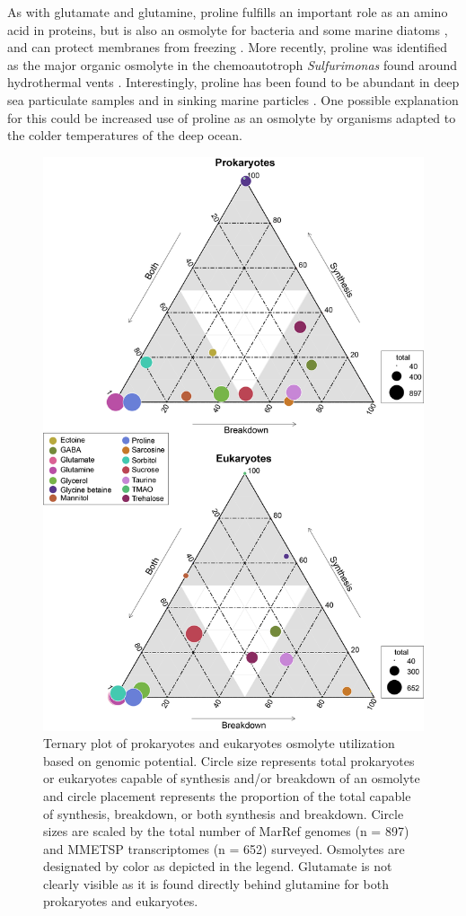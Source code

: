 \documentclass[utf8]{frontiersSCNS} %
\begin{document}
As with glutamate and glutamine, proline fulfills an important role as an amino acid in proteins, but is also an osmolyte for bacteria \citep{Burg2008,Brill2011} and some marine diatoms \citep{Dawson2020,Dawson2020.2}, and can protect membranes from freezing \citep{Yancey2005}. More recently, proline was identified as the major organic osmolyte in the chemoautotroph \emph{Sulfurimonas} found around hydrothermal vents \citep{Gotz2018}. Interestingly, proline has been found to be abundant in deep sea particulate samples \citep{Takasu2015,Johnson2021} and in sinking marine particles \citep{Johnson2020}. One possible explanation for this could be increased use of proline as an osmolyte by organisms adapted to the colder temperatures of the deep ocean.
\begin{figure}[t!]
    \centering
    \includegraphics[width = 0.6\columnwidth]{Figures/ProkEukOverlapBW.png}
    \caption{Ternary plot of prokaryotes and eukaryotes osmolyte utilization based on genomic potential. Circle size represents total prokaryotes or eukaryotes capable of synthesis and/or breakdown of an osmolyte and circle placement represents the proportion of the total capable of synthesis, breakdown, or both synthesis and breakdown. Circle sizes are scaled by the total number of MarRef genomes (n = 897) and MMETSP transcriptomes (n = 652) surveyed. Osmolytes are designated by color as depicted in the legend. Glutamate is not clearly visible as it is found directly behind glutamine for both prokaryotes and eukaryotes.}
    \label{fig:euk-bac-comp}
\end{figure}
\end{document}
